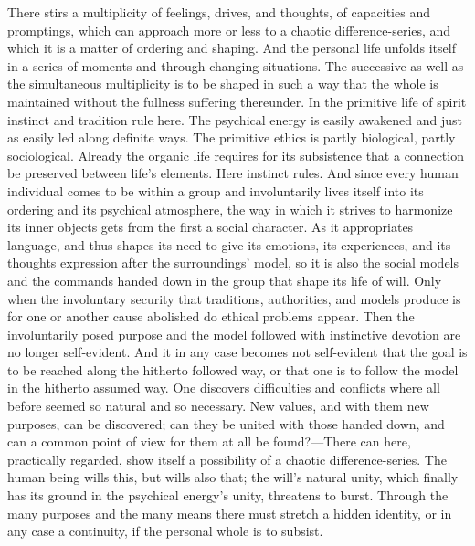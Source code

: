 \documentclass[12pt,a4paper]{book}
\newcommand{\opage}[1]{\marginnote{\footnotesize\textit{[#1]}}}
\begin{document}
There stirs a multiplicity of feelings, drives, and thoughts, of capacities and promptings, which can
approach more or less to a chaotic difference-series, and which it is a matter of ordering and shaping.
And the personal life unfolds itself in a series of moments and through changing situations. The
successive as well as the simultaneous multiplicity is to be shaped in such a way that the whole is
maintained without the fullness suffering thereunder. In the primitive life of spirit instinct and
tradition rule here. The psychical energy is easily awakened and just as easily led along definite ways.
The primitive ethics is partly biological, partly sociological. Already the organic life requires for
its subsistence that a connection be preserved between life's elements. Here instinct rules. And since
every human individual comes to be within a group and involuntarily lives itself into its ordering and
its psychical atmosphere, the way in which it strives to harmonize its inner objects gets from the first
a social character. As it appropriates language, and thus shapes its need to \opage{351}give its emotions, its
experiences, and its thoughts expression after the surroundings' model, so it is also the social models
and the commands handed down in the group that shape its life of will. Only when the involuntary security
that traditions, authorities, and models produce is for one or another cause abolished do ethical
problems appear. Then the involuntarily posed purpose and the model followed with instinctive devotion
are no longer self-evident. And it in any case becomes not self-evident that the goal is to be reached
along the hitherto followed way, or that one is to follow the model in the hitherto assumed way. One
discovers difficulties and conflicts where all before seemed so natural and so necessary. New values,
and with them new purposes, can be discovered; can they be united with those handed down, and can a
common point of view for them at all be found?---There can here, practically regarded, show itself a
possibility of a chaotic difference-series. The human being wills this, but wills also that; the will's
natural unity, which finally has its ground in the psychical energy's unity, threatens to burst. Through
the many purposes and the many means there must stretch a hidden identity, or in any case a continuity,
if the personal whole is to subsist.
\end{document}
